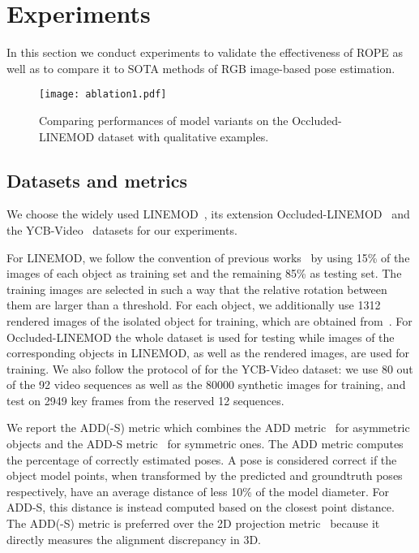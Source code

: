 \documentclass[10pt,twocolumn,letterpaper]{article}
\begin{document}
\section{Experiments}
In this section we conduct experiments to validate the effectiveness of ROPE as well as to compare it to SOTA methods of RGB image-based pose estimation.

\begin{figure*}[ht]
    \centering
    \texttt{[image: ablation1.pdf]}
    \caption{Comparing performances of model variants on the Occluded-LINEMOD dataset with qualitative examples. }
    \label{fig:ablation1}
\end{figure*}

\subsection{Datasets and metrics}
We choose the widely used LINEMOD~\cite{Hinterstoisser2012model}, its extension Occluded-LINEMOD~\cite{Brachmann2014learning} and the YCB-Video~\cite{Xiang2018posecnn} datasets for our experiments. 

For LINEMOD, we follow the convention of previous works~\cite{rad2017bb8, tekin2018real, Peng2019pvnet, Zakharov2019dpod} by using 15\% of the images of each object as training set and the remaining 85\% as testing set. The training images are selected in such a way that the relative rotation between them are larger than a threshold. For each object, we additionally use 1312 rendered images of the isolated object for training, which are obtained from~\cite{hodan2018bop}. For Occluded-LINEMOD the whole dataset is used for testing while images of the corresponding objects in LINEMOD, as well as the rendered images, are used for training. We also follow the protocol of \cite{Xiang2018posecnn, Oberweger2018making} for the YCB-Video dataset: we use 80 out of the 92 video sequences as well as the 80000 synthetic images for training, and test on 2949 key frames from the reserved 12 sequences.  



We report the ADD(-S) metric which combines the ADD metric~\cite{Hinterstoisser2012model} for asymmetric objects and the ADD-S metric~\cite{Xiang2018posecnn} for symmetric ones. The ADD metric computes the percentage of correctly estimated poses. A pose is considered correct if the object model points, when transformed by the predicted and groundtruth poses respectively, have an average distance of less 10\% of the model diameter. For ADD-S, this distance is instead computed based on the closest point distance. The ADD(-S) metric is preferred over the 2D projection metric~\cite{brachmann2016Uncertainty} because it directly measures the alignment discrepancy in 3D. 
\end{document}
